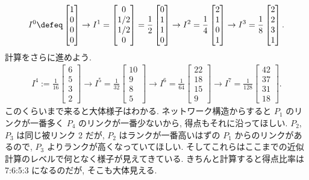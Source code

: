 \documentclass[openany, a4paper, oneside]{jsbook}
\begin{document}
\begin{align}
 I^0
 \defeq
 \begin{bmatrix}
  1\\
  0\\
  0\\
  0
 \end{bmatrix}
 \to
 I^1
 =
 \begin{bmatrix}
  0\\
  1/2\\
  1/2\\
  0
 \end{bmatrix}
 =
 \frac{1}{2}
 \begin{bmatrix}
  0\\
  1\\
  1\\
  0
 \end{bmatrix}
 \to
 I^2
 =
 \frac{1}{4}
 \begin{bmatrix}
  2\\
  1\\
  0\\
  1
 \end{bmatrix}
 \to
 I^3
 =
 \frac{1}{8}
 \begin{bmatrix}
  2\\
  2\\
  3\\
  1
 \end{bmatrix}.
\end{align}
計算をさらに進めよう.
\begin{align}
 I^4
 :=
 \frac{1}{16}
 \begin{bmatrix}
  6\\
  5\\
  3\\
  2
 \end{bmatrix}
 \to
 I^5
 =
 \frac{1}{32}
 \begin{bmatrix}
  10\\
  9\\
  8\\
  5
 \end{bmatrix}
 \to
 I^6
 =
 \frac{1}{64}
 \begin{bmatrix}
  22\\
  18\\
  15\\
  9
 \end{bmatrix}
 \to
 I^7
 =
 \frac{1}{128}
 \begin{bmatrix}
  42\\
  37\\
  31\\
  18
 \end{bmatrix}
 .
\end{align}
このくらいまで来ると大体様子はわかる.
ネットワーク構造からすると $P_1$ のリンクが一番多く $P_4$ のリンクが一番少ないから, 得点もそれに沿ってほしい.
$P_2$, $P_3$ は同じ被リンク 2 だが, $P_2$ はランクが一番高いはずの $P_1$ からのリンクがあるので,
$P_3$ よりランクが高くなっていてほしい.
そしてこれらはここまでの近似計算のレベルで何となく様子が見えてきている.
きちんと計算すると得点比率は 7:6:5:3 になるのだが, そこも大体見える.
\end{document}

